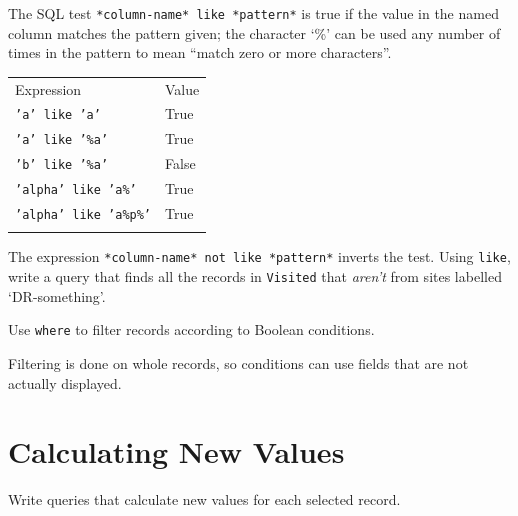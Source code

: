 \documentclass{book}
\begin{document}
\begin{challenge}
  The SQL test \texttt{*column-name* like *pattern*} is true if the
  value in the named column matches the pattern given; the character
  `\%' can be used any number of times in the pattern to mean ``match
  zero or more characters''.

  \begin{tabular}{ll}
  \hline\noalign{\medskip}
  Expression & Value
  \\\noalign{\medskip}
  \hline\noalign{\medskip}
  \texttt{'a' like 'a'} & True
  \\\noalign{\medskip}
  \texttt{'a' like '\%a'} & True
  \\\noalign{\medskip}
  \texttt{'b' like '\%a'} & False
  \\\noalign{\medskip}
  \texttt{'alpha' like 'a\%'} & True
  \\\noalign{\medskip}
  \texttt{'alpha' like 'a\%p\%'} & True
  \\\noalign{\medskip}
  \hline
  \end{tabular}

  The expression \texttt{*column-name* not like *pattern*} inverts the
  test. Using \texttt{like}, write a query that finds all the records in
  \texttt{Visited} that \emph{aren't} from sites labelled
  `DR-something'.
\end{challenge}

\begin{keypoints}
\begin{swcitemize}
\item
  Use \texttt{where} to filter records according to Boolean conditions.
\item
  Filtering is done on whole records, so conditions can use fields that
  are not actually displayed.
\end{swcitemize}
\end{keypoints}

\section{Calculating New Values}

\begin{objectives}
\begin{swcitemize}
\item
  Write queries that calculate new values for each selected record.
\end{swcitemize}
\end{objectives}
\end{document}
